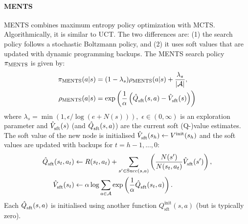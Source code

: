 \documentclass{article}
\newcommand{\etal}{et~al.\ }
\newcommand{\cl}[1]{\mathcal{#1}}
\newcommand{\Vst}[2]{\hat{V}^{#2}_{\textnormal{sft}}(#1)}
\newcommand{\Qst}[3]{\hat{Q}^{#3}_{\textnormal{sft}}(#1,#2)}
\newcommand{\succc}[2]{\textnormal{Succ}(#1,#2)}
\theoremstyle{plain}
\begin{document}
    
        \paragraph{MENTS} 
            MENTS \cite{xiao2019maximum} combines maximum entropy policy optimization \cite{haarnoja2017reinforcement, ziebart2008maximum} with MCTS. Algorithmically, it is similar to UCT. The two differences are: (1) the search policy follows a stochastic Boltzmann policy, and (2) it uses soft values that are updated with dynamic programming backups. The MENTS search policy $\pi_{\textnormal{MENTS}}$ is given by:
            \begin{align}
                \pi_{\textnormal{MENTS}}(a|s) &= (1-\lambda_s)\rho_{\textnormal{MENTS}}(a|s) + \frac{\lambda_s}{|\cl{A}|}, \\
                \rho_{\textnormal{MENTS}}(a|s) &= \exp\left(\frac{1}{\alpha}\left(\Qst{s}{a}{}-\Vst{s}{}\right)\right) \label{eq:rhosft}
            \end{align}
            \noindent where $\lambda_s=\min(1,\epsilon/\log(e+N(s))),$ $\epsilon \in (0,\infty)$ is an exploration parameter and $\Vst{s}{}$ (and $\Qst{s}{a}{}$) are the current soft (Q-)value estimates. 
            The soft value of the new node is initialised $\Vst{s_h}{}\leftarrow V^{\text{init}}(s_h)$ and the soft values are updated with backups for $t=h-1,...,0$:
            \begin{align}
                \Qst{s_t}{a_t}{} &\leftarrow R(s_t,a_t) + \sum_{s'\in\succc{s}{a}} \left( \frac{N(s')}{N(s_t,a_t)} \Vst{s'}{} \right), \\ %
                \Vst{s_t}{} &\leftarrow \alpha \log \sum_{a\in\cl{A}} \exp \left(\frac{1}{\alpha}\Qst{s_t}{a}{} \right). \label{eq:soft_v_backup}
            \end{align}
            Each $\Qst{s}{a}{}$ is initialised using another function $Q^{\text{init}}_{\text{sft}}(s,a)$ (but is typically zero).
    
\end{document}
